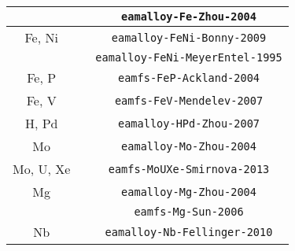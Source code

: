 \begin{table}
{\begin{center}
\begin{tabular}{ccc}
        & \cite{zhou2004misfit} & \verb+eamalloy-Fe-Zhou-2004+\\\hline
        Fe, Ni  & \cite{bonny2009fe} & \verb+eamalloy-FeNi-Bonny-2009+\\
        & \cite{meyer1995molecular} & \verb+eamalloy-FeNi-MeyerEntel-1995+\\\hline
        Fe, P & \cite{ackland2004development} & \verb+eamfs-FeP-Ackland-2004+\\\hline
        Fe, V & \cite{mendelev2007simulation} & \verb+eamfs-FeV-Mendelev-2007+\\\hline
        H, Pd & \cite{zhou2008embedded} & \verb+eamalloy-HPd-Zhou-2007+\\\hline
        Mo & \cite{zhou2004misfit} & \verb+eamalloy-Mo-Zhou-2004+\\\hline
        Mo, U, Xe & \cite{smirnova2013ternary} & \verb+eamfs-MoUXe-Smirnova-2013+\\\hline
        Mg & \cite{zhou2004misfit} & \verb+eamalloy-Mg-Zhou-2004+\\
        & \cite{sun2006crystal} & \verb+eamfs-Mg-Sun-2006+\\\hline
        Nb & \cite{fellinger2010force} & \verb+eamalloy-Nb-Fellinger-2010+\\\hline
      \end{tabular}
    \end{center}
  }
\end{table}
